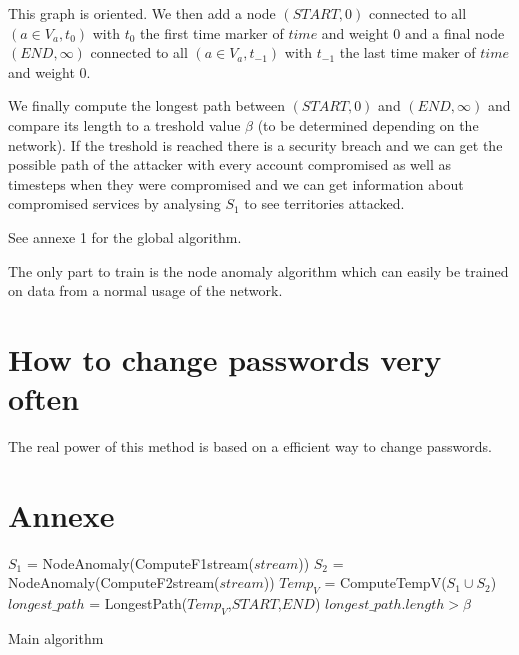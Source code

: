 \documentclass[11pt]{article}
\begin{document}
This graph is oriented. We then add a node $(START,0)$ connected to all $(a\in V_a,t_0)$ with $t_0$ the first time marker of $time$ and weight 0 and a final node $(END,\infty)$ connected to all $(a\in V_a,t_{-1})$ with $t_{-1}$ the last time maker of $time$ and weight 0. 

We finally compute the longest path between $(START,0)$ and $(END,\infty)$ and compare its length to a treshold value $\beta$ (to be determined depending on the network). If the treshold is reached there is a security breach and we can get the possible path of the attacker with every account compromised as well as timesteps when they were compromised and we can get information about compromised services by analysing $S_1$ to see territories attacked.

See annexe 1 for the global algorithm.

The only part to train is the node anomaly algorithm which can easily be trained on data from a normal usage of the network.

\section{How to change passwords very often}
The real power of this method is based on a efficient way to change passwords.

\section{Annexe}
\begin{algorithm}[H]
 
 $S_1$ = NodeAnomaly(ComputeF1stream($stream$))\;
 $S_2$ = NodeAnomaly(ComputeF2stream($stream$))\;
 $Temp_V$ = ComputeTempV($S_1\cup S_2$)\;
 $longest\_path$ = LongestPath($Temp_V$,$START$,$END$)\;
 \Return $longest\_path.length>\beta$\;
 \caption{Main algorithm}
\end{algorithm}
\end{document}
